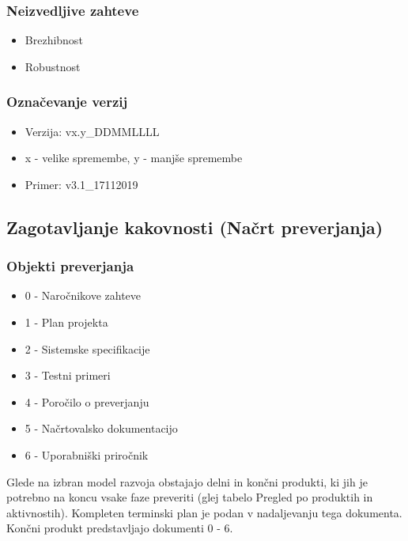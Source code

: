 \documentclass[a4paper,12pt]{article}
\begin{document}
		\subsubsection{Neizvedljive zahteve}

				\begin{itemize}
					\item Brezhibnost
					\item Robustnost
				\end{itemize}

		\subsubsection{Označevanje verzij}

				\begin{itemize}
					\item Verzija: vx.y\_DDMMLLLL
					\item x - velike spremembe, y - manjše spremembe
					\item Primer: v3.1\_17112019
				\end{itemize}

	\subsection{Zagotavljanje kakovnosti (Načrt preverjanja)}

\setul{0.6ex}{0.17ex}



		\subsubsection{Objekti preverjanja}

			\begin{itemize}
				\item 0 - Naročnikove zahteve
				\item 1 - Plan projekta
				\item 2 - Sistemske specifikacije
				\item 3 - Testni primeri
				\item 4 - Poročilo o preverjanju
				\item 5 - Načrtovalsko dokumentacijo
				\item 6 - Uporabniški priročnik	
			\end{itemize}

			Glede na izbran model razvoja obstajajo delni in končni produkti, 
			ki jih je potrebno na koncu vsake faze preveriti (glej tabelo 
			Pregled po produktih in aktivnostih). Kompleten terminski plan 
			je podan v nadaljevanju tega dokumenta. Končni produkt 
			predstavljajo dokumenti 0 - 6.
\end{document}

